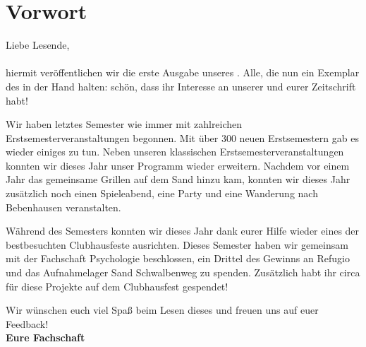 \section{Vorwort}
\Large
Liebe Lesende,\\
\\
\normalsize
hiermit veröffentlichen wir die erste Ausgabe unseres \nameit. Alle, die nun ein Exemplar des \nameit \space in der Hand halten: schön, dass ihr Interesse an unserer und eurer Zeitschrift habt! 

Wir haben letztes Semester wie immer mit zahlreichen Erstsemesterveranstaltungen begonnen. Mit über 300 neuen Erstsemestern gab es wieder einiges zu tun.
Neben unseren klassischen Erstsemesterveranstaltungen konnten wir dieses Jahr unser Programm wieder erweitern. Nachdem vor einem Jahr das gemeinsame Grillen auf dem Sand hinzu kam, konnten wir dieses Jahr zusätzlich noch einen Spieleabend, eine Party und eine Wanderung nach Bebenhausen veranstalten.

Während des Semesters konnten wir dieses Jahr dank eurer Hilfe wieder eines der bestbesuchten Clubhausfeste ausrichten. Dieses Semester haben wir gemeinsam mit der Fachschaft Psychologie beschlossen, ein Drittel des Gewinns an Refugio und das Aufnahmelager Sand Schwalbenweg zu spenden. Zusätzlich habt ihr circa  für diese Projekte auf dem Clubhausfest gespendet! 

Wir wünschen euch viel Spaß beim Lesen dieses \nameit \space und freuen uns auf euer Feedback!\\

\large
\textbf{Eure Fachschaft}
\normalsize